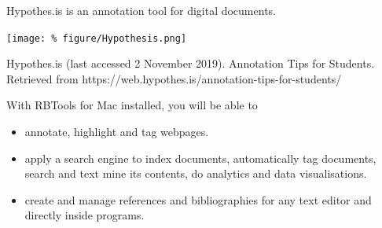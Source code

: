 \documentclass[unknownkeysallowed,usepdftitle=false, parskip=full]{beamer}
\newcommand{\secvariable}{nothing}
\newcommand{\mysection}[1]{\renewcommand{\secvariable}{#1}
}
\begin{document}
\mysection{minor}
\begin{frame}\label{\secvariable} %

Hypothes.is is an annotation tool for digital documents.
  \vspace{0.5cm}

\texttt{[image: \%
figure/Hypothesis.png]}

 Hypothes.is (last accessed 2 November 2019). Annotation Tips for Students. Retrieved from https://web.hypothes.is/annotation-tips-for-students/

\end{frame}

\mysection{conclusion}
\begin{frame}\label{\secvariable}
  
With RBTools for Mac installed, you will be able to  
  \begin{itemize}
   \item annotate, highlight and tag webpages. 
  \item apply a search engine to index documents, automatically tag documents, search and text mine its contents, do analytics and data visualisations.
  \item create and manage references and bibliographies for any text editor and directly inside programs.

  \end{itemize}

\end{frame}
\end{document}
